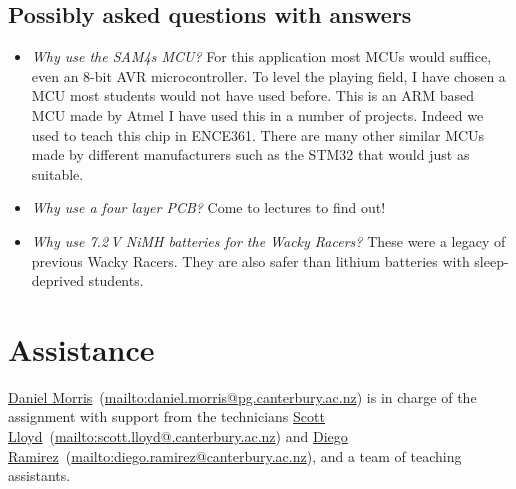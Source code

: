 \documentclass[11pt, a4paper]{article}
\makeatletter
\newcommand{\danielemail}{\url{mailto:daniel.morris@pg.canterbury.ac.nz}}
\newcommand{\scottemail}{\url{mailto:scott.lloyd@.canterbury.ac.nz}}
\newcommand{\diegoemail}{\url{mailto:diego.ramirez@canterbury.ac.nz}}
\newcommand{\daniel}{\href{mailto:daniel.morris@pg.canterbury.ac.nz}{Daniel Morris}}
\newcommand{\scott}{\href{mailto:scott.lloyd@.canterbury.ac.nz}{Scott Lloyd}}
\newcommand{\diego}{\href{mailto:diego.ramirez@canterbury.ac.nz}{Diego Ramirez}}
\makeatother
\begin{document}
\subsection{Possibly asked questions with answers}

\begin{itemize}
\item \emph{Why use the SAM4s MCU?}  For this application most MCUs
  would suffice, even an 8-bit AVR microcontroller.  To level the
  playing field, I have chosen a MCU most students would not have used
  before.  This is an ARM based MCU made by Atmel I have used this in
  a number of projects.  Indeed we used to teach this chip in ENCE361.
  There are many other similar MCUs made by different manufacturers
  such as the STM32 that would just as suitable.

\item \emph{Why use a four layer PCB?}  Come to lectures to find out!

\item \emph{Why use 7.2\,V NiMH batteries for the Wacky Racers?}
  These were a legacy of previous Wacky Racers.  They are also safer
  than lithium batteries with sleep-deprived students.


\end{itemize}


\section{Assistance}

\daniel\ (\danielemail) is in charge of the assignment with support
from the technicians \scott\ (\scottemail) and \diego\ (\diegoemail),
and a team of teaching assistants.
\end{document}
